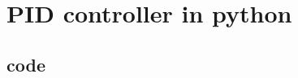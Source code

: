 \chapter{\label{method}PID controller in python}


\section{code}

\setcounter{equation}{0}
\setcounter{table}{0}
\setcounter{figure}{0}


    



